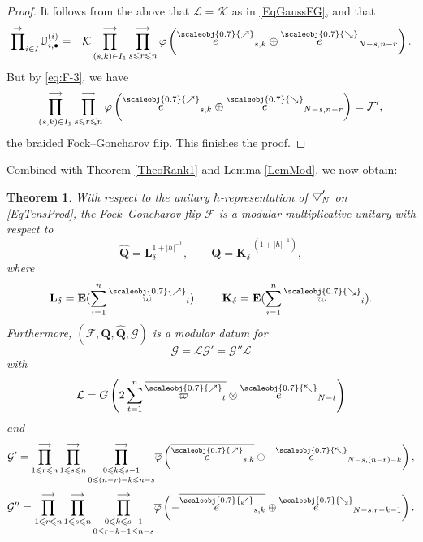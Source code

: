 \documentclass[11pt, reqno]{amsart}
\newtheorem{theorem}{Theorem}[section]
\theoremstyle{definition}
\numberwithin{equation}{section}
\def\longra{\longrightarrow}
\newcommand{\hr}[1]{\left(#1\right)}                                                    %
\def\le{\leqslant}
\def\Fc{\mathcal F'}
\newcommand{\eb}{\mathbf{E}}
\newcommand{\Gauss}{G}
\newcommand{\Qb}{\mathbf{Q}}
\newcommand{\bbU}{\mathbb{U}}
\newcommand{\Kc}{\mathcal{K}}
\newcommand{\Fct}{\mathcal{F}}
\newcommand{\tFct}{\mathcal{G}}
\newcommand{\tFc}{\mathcal{G}'}
\newcommand{\tFctt}{\mathcal{G}''}
\newcommand{\tKc}{\mathcal L}
\newcommand{\nears}{\scaleobj{0.7}{\nearrow}}
\newcommand{\sears}{\scaleobj{0.7}{\searrow}}
\newcommand{\nwars}{\scaleobj{0.7}{\nwarrow}}
\newcommand{\swars}{\scaleobj{0.7}{\swarrow}}
\newcommand{\nee}{\overset{\nears}{e}}
\newcommand{\seee}{\overset{\sears}{e}}
\newcommand{\nwe}{\overset{\nwars}{e}}
\newcommand{\swe}{\overset{\swars}{e}}
\newcommand{\nevarpi}{\overset{\nears}{\varpi}}
\newcommand{\sevarpi}{\overset{\sears}{\varpi}}
\newcommand{\Kb}{\mathbf{K}}
\newcommand{\Lb}{\mathbf{L}}
\newcommand{\wbtd}[1]{\raisebox{\depth}{$\bigtriangledown'$\!\!}_{#1}}
\newcommand{\Lc}{\mathcal{L}}
\begin{document}
\begin{proof}
It follows from the above that $\Lc = \Kc$ as in \eqref{EqGaussFG}, and that
\begin{eqnarray*}
\overset{\rightarrow}{\prod}_{i\in I} \bbU^{(i)}_{i,\bullet} &=& \Kc  \prod^{\longra}_{(s,k)\in I_1}\prod_{s \le r \le n}^{\longra}   \varphi\hr{\nee_{s,k} \oplus \seee_{N-s,n-r}}.
\end{eqnarray*}
But by \eqref{eq:F-3}, we have
\[
 \prod^{\longra}_{(s,k)\in I_1}\prod_{s \le r \le n}^{\longra}   \varphi\hr{\nee_{s,k} \oplus \seee_{N-s,n-r}} = \Fc,
\]
the braided Fock--Goncharov flip.
 This finishes the proof.
\end{proof}

Combined with Theorem \ref{TheoRank1} and Lemma \ref{LemMod}, we now obtain:
\begin{theorem}\label{TheoModFGFin}
With respect to the unitary $\hbar$-representation of $\wbtd{N}$ on \eqref{EqTensProd}, the Fock--Goncharov flip $\Fct$ is a modular multiplicative unitary with respect to 
\begin{equation}\label{EqModularityMUFG}
\hat{\Qb} = \Lb_{\delta}^{1+|\hbar|^{-1}},\qquad \Qb = \Kb_{\delta}^{-(1+|\hbar|^{-1})},
\end{equation}
where
\[
  \Lb_{\delta} = \eb(\sum_{i=1}^n \nevarpi_i),\qquad \Kb_{\delta}=  \eb(\sum_{i=1}^n \sevarpi_i).
\]
Furthermore, $(\Fct,\Qb,\hat{\Qb},\tFct)$ is a modular datum for  
\begin{equation}\label{EqModFG}
\tFct = \tKc \tFc = \tFctt \tKc
\end{equation}
with
\begin{equation}\label{EqTildeK}
\tKc = \Gauss\left(2\sum_{t=1}^n \overline{\nevarpi_t} \otimes \nwe_{N-t}\right) 
\end{equation}
and 
\begin{equation}\label{EqTildeFPrime}
\tFc = \prod_{1 \le r \le n}^{\longra} \prod_{1 \le s \le n}^{\longra} \underset{0\le (n-r)-k\le n-s}{\prod_{0 \le k \le s-1}^{\longra}}   \overline{\varphi}\hr{\overline{\nee_{s,k}}\oplus -\nwe_{N-s,(n-r)-k}},
\end{equation}
\begin{equation}\label{EqTildeFDoublePrime}
\tFctt = \prod_{1 \le r \le n}^{\longra} \prod_{1 \le s \le n}^{\longra} \underset{0\leq r-k-1 \leq n-s}{\prod_{0 \le k \le s-1}^{\longra}}   \overline{\varphi}\hr{-\overline{\swe_{s,k}}\oplus \seee_{N-s,r-k-1}}.
\end{equation}
\end{theorem}
\end{document}
